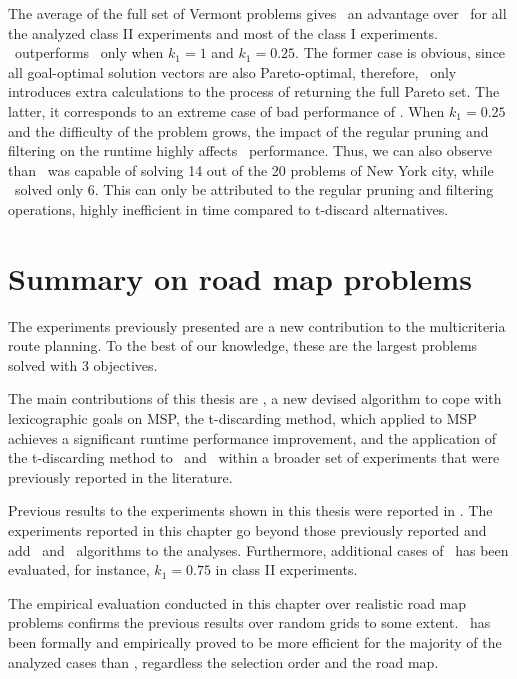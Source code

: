 The average of the full set of Vermont problems gives \lexgote \ an advantage over \namoate \ for all the analyzed class II experiments and most of the class I experiments. \namoate \ outperforms \lexgote \ only when $k_1 = 1$ and $k_1 = 0.25$. The former case is obvious, since all goal-optimal solution vectors are also Pareto-optimal, therefore, \lexgote \ only introduces extra calculations to the process of returning the full Pareto set. The latter, it corresponds to an extreme case of bad performance of \lexgote. When $k_1 = 0.25$ and the difficulty of the problem grows, the impact of the regular pruning and filtering on the runtime highly affects \lexgote \ performance. Thus, we can also observe than \namoate \ was capable of solving 14 out of the 20 problems of New York city, while \lexgote \ solved only 6. This can only be attributed to the regular pruning and filtering operations, highly inefficient in time compared to t-discard alternatives.

\section{Summary on road map problems}
\label{chapEmpiricalAnalysis:sec:summarygridste}

The experiments previously presented are a new contribution to the multicriteria route planning. To the best of our knowledge, these are the largest problems solved with 3 objectives. 

The main contributions of this thesis are \lexgo, a new devised algorithm to cope with lexicographic goals on MSP, the t-discarding method, which applied to MSP achieves a significant runtime performance improvement, and the application of the t-discarding method to \namoa \ and \lexgo \ within a broader set of experiments that were previously reported in the literature. 

Previous results to the experiments shown in this thesis were reported in \citet{Pulido2015}. The experiments reported in this chapter go beyond those previously reported and add \lexgolin \ and \lexgote \ algorithms to the analyses. Furthermore, additional cases of \lexgo \ has been evaluated, for instance, $k_1=0.75$ in class II experiments. 

The empirical evaluation conducted in this chapter over realistic road map problems confirms the previous results over random grids to some extent.
\lexgo \ has been formally and empirically proved to be more efficient for the majority of the analyzed cases than \namoa, regardless the selection order and the road map. 

